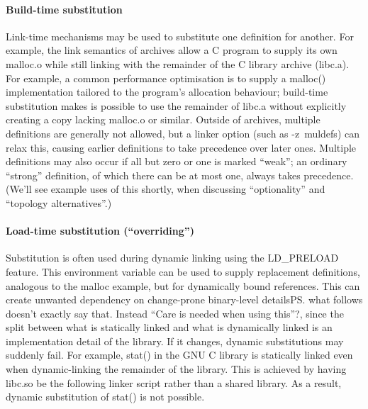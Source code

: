 
\paragraph{Build-time substitution}
Link-time mechanisms may be used to substitute one definition for another.
For example, the link semantics of archives allow a C program
to supply its own \textsf{malloc.o} while still linking with 
the remainder of the C library archive (\textsf{libc.a}).
For example, a common performance optimisation is to supply a 
\textsf{malloc()} implementation tailored to the program's allocation behaviour; 
build-time substitution makes is possible to use the remainder of \textsf{libc.a} 
without explicitly creating a copy lacking \textsf{malloc.o} or similar.
Outside of archives, multiple definitions are generally not allowed,
but a linker option (such as \textsf{-z~muldefs}) can relax this, 
causing earlier definitions to take precedence over later ones.
Multiple definitions may also occur if all but zero or one is marked ``weak'';
an ordinary ``strong'' definition, of which there can be at most one, always takes precedence.
(We'll see example uses of this shortly, when discussing 
``optionality'' and ``topology alternatives''.)

\paragraph{Load-time substitution (``overriding'')}
Substitution is often used during dynamic linking using the \textsf{LD\_PRELOAD}
feature. This environment variable can be used to supply replacement
definitions, analogous to the \textsf{malloc} example, but for dynamically bound references.
This can create unwanted dependency on change-prone binary-level details\ps{what follows doesn't exactly say
  that. Instead ``Care is needed when using this''?}, 
since the split between what is statically linked and what is dynamically linked
is an implementation detail of the library.
If it changes, dynamic substitutions may suddenly fail.
For example, \textsf{stat()} in the GNU C library is statically linked even when
dynamic-linking the remainder of the library. This is achieved by having \textsf{libc.so} be the following linker script rather than a shared library.
As a result, dynamic substitution of \textsf{stat()} is not possible.

